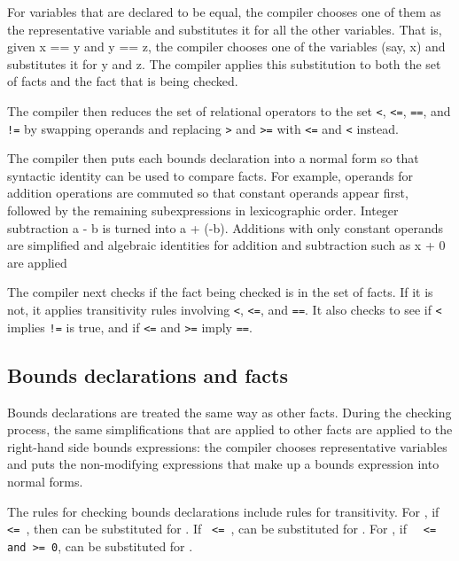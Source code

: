 For variables that are declared to be equal, the compiler chooses one of
them as the representative variable and substitutes it for all the other
variables. That is, given x == y and y == z, the compiler chooses one of
the variables (say, x) and substitutes it for y and z. The compiler
applies this substitution to both the set of facts and the fact that is
being checked.

The compiler then reduces the set of relational operators to the set
\texttt{<}, \texttt{<=}, \texttt{==},  and \texttt{!=}
by swapping operands and replacing \texttt{>} and \texttt{>=} 
with \texttt{<=} and \texttt{<} instead.

The compiler then puts each bounds declaration into a normal form so
that syntactic identity can be used to compare facts. For example,
operands for addition operations are commuted so that constant operands
appear first, followed by the remaining subexpressions in lexicographic
order. Integer subtraction a - b is turned into a + (-b). Additions
with only constant operands are simplified and algebraic identities for
addition and subtraction such as x + 0 are applied

The compiler next checks if the fact being checked is in the set of
facts. If it is not, it applies transitivity rules involving
\texttt{<}, \texttt{<=}, and \texttt{==}.
It also checks to see if \texttt{<}
implies \texttt{!=} is true, and if \texttt{<=} and
\texttt{>=} imply \texttt{==}.

\subsection{Bounds declarations and facts}

Bounds declarations are treated the same way as other facts. During the
checking process, the same simplifications that are applied to other
facts are applied to the right-hand side bounds expressions: the
compiler chooses representative variables and puts the non-modifying
expressions that make up a bounds expression into normal forms.

The rules for checking bounds declarations include rules for
transitivity. For , if
\texttt{ <= }, then  can
be substituted for . 
If \texttt{ <= },  can be substituted for
.  For , if \
\texttt{ <=  and  >= 0}, 
\var{e2} can be substituted for \var{e1}.

